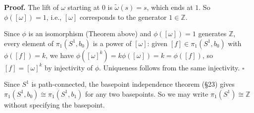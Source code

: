 \documentclass[11pt]{report}
\renewenvironment{proof}[1][Proof]{\noindent\textbf{#1.} }{\hfill$\square$\par\vspace{5pt}}
\begin{document}
\begin{proof}
The lift of $\omega$ starting at $0$ is $\tilde{\omega}(s) = s$, which ends at $1$. So $\phi([\omega]) = 1$, i.e., $[\omega]$ corresponds to the generator $1 \in \mathbb{Z}$.

Since $\phi$ is an isomorphism (Theorem above) and $\phi([\omega]) = 1$ generates $\mathbb{Z}$, every element of $\pi_1(S^1, b_0)$ is a power of $[\omega]$: given $[f] \in \pi_1(S^1, b_0)$ with $\phi([f]) = k$, we have $\phi([\omega]^k) = k\phi([\omega]) = k = \phi([f])$, so $[f] = [\omega]^k$ by injectivity of $\phi$. Uniqueness follows from the same injectivity.
\end{proof}

\begin{rembox}
Since $S^1$ is path-connected, the basepoint independence theorem (\S 23) gives $\pi_1(S^1, b_0) \cong \pi_1(S^1, b_1)$ for any two basepoints. So we may write $\pi_1(S^1) \cong \mathbb{Z}$ without specifying the basepoint.
\end{rembox}
\end{document}
